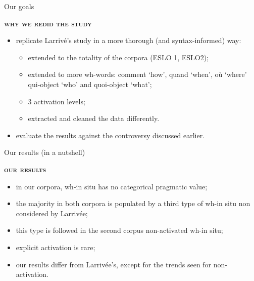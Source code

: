 \documentclass[lesson_slides]{subfiles}
\begin{document}
\begin{frame}[c]{Our goals}

    \noindent \textbf{\textsc{why we redid the study}} \pause 
    \begin{itemize}
        \item[\ding{227}] replicate Larrivé’s study in a more thorough (and syntax-informed) way: \pause
            \begin{itemize}
            \item extended to the totality of the corpora (ESLO 1, ESLO2); \pause
            \item extended to more wh-words: comment ‘how’, quand ‘when’, où ‘where’ qui-object ‘who’ and quoi-object ‘what’; \pause
            \item 3 activation levels; \pause
            \item extracted and cleaned the data differently. \pause
            \end{itemize}
        \item[\ding{227}] evaluate the results against the controversy discussed earlier.
        \end{itemize} 
  
\end{frame}

\begin{frame}{Our results (in a nutshell)}

    \noindent \textbf{\textsc{our results}} \pause 
    \begin{itemize}
        \item[\ding{227}] in our corpora, wh-in situ has no categorical pragmatic value; \pause
        \item[\ding{227}] the majority in both corpora is populated by a third type of wh-in situ non considered by Larrivée; \pause
        \item[\ding{227}] this type is followed in the second corpus non-activated wh-in situ; \pause
        \item[\ding{227}] explicit activation is rare; \pause
        \item[\ding{227}] our results differ from Larrivée’s, except for the trends seen for non-activation.
    \end{itemize}
    
\end{frame}
\end{document}
